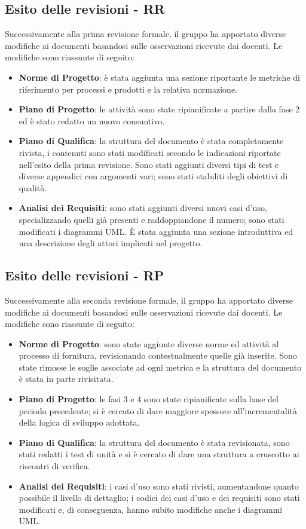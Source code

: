 \subsection{Esito delle revisioni - RR}
Successivamente alla prima revisione formale, il gruppo ha apportato diverse modifiche ai documenti basandosi sulle osservazioni ricevute dai docenti. Le modifiche sono riassunte di seguito:
	\begin{itemize}
		\item \textbf{Norme di Progetto}: è stata aggiunta una sezione riportante le metriche di riferimento per processi e prodotti e la relativa normazione. 
		\item \textbf{Piano di Progetto}: le attività sono state ripianificate a partire dalla fase 2 ed è stato redatto un nuovo consuntivo.
		\item \textbf{Piano di Qualifica}: la struttura del documento è stata completamente rivista, i contenuti sono stati modificati secondo le indicazioni riportate nell'esito della prima revisione. Sono stati aggiunti diversi tipi di test e diverse appendici con argomenti vari; sono stati stabiliti degli obiettivi di qualità.
		\item \textbf{Analisi dei Requisiti}: sono stati aggiunti diversi nuovi casi d'uso, specializzando quelli già presenti e raddoppiandone il numero; sono stati modificati i diagrammi UML. \`E stata aggiunta una sezione introduttiva ed una descrizione degli attori implicati nel progetto. 
	\end{itemize}

\subsection{Esito delle revisioni - RP}	
Successivamente alla seconda revisione formale, il gruppo ha apportato diverse modifiche ai documenti basandosi sulle osservazioni ricevute dai docenti. Le modifiche sono riassunte di seguito:
	\begin{itemize}
		\item \textbf{Norme di Progetto}: sono state aggiunte diverse norme ed attività al processo di fornitura, revisionando contestualmente quelle già inserite. Sono state rimosse le soglie associate ad ogni metrica e la struttura del documento è stata in parte rivisitata.
		\item \textbf{Piano di Progetto}: le fasi 3 e 4 sono state ripianificate sulla base del periodo precedente; si è cercato di dare maggiore spessore all'incrementalità della logica di sviluppo adottata. 
		\item \textbf{Piano di Qualifica}: la struttura del documento è stata revisionata, sono stati redatti i test di unità e si è cercato di dare una struttura a cruscotto ai riscontri di verifica.
		\item \textbf{Analisi dei Requisiti}: i casi d'uso sono stati rivisti, aumentandone quanto possibile il livello di dettaglio; i codici dei casi d'uso e dei requisiti sono stati modificati e, di conseguenza, hanno subito modifiche anche i diagrammi UML.
	\end{itemize}

